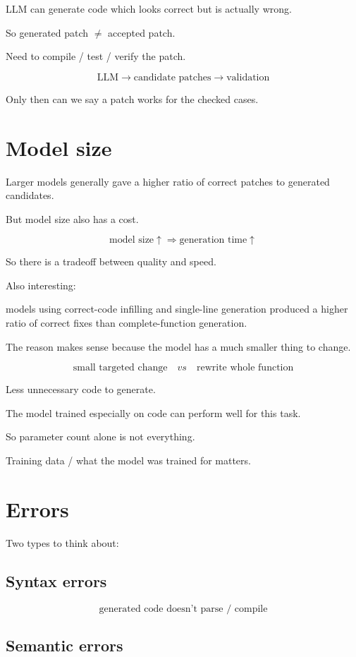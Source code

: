\documentclass[11pt]{book}
\begin{document}
LLM can generate code which looks correct but is
actually wrong.

So generated patch $\neq$ accepted patch.

Need to compile / test / verify the patch.

\[
\text{LLM}
\rightarrow
\text{candidate patches}
\rightarrow
\text{validation}
\]

Only then can we say a patch works for the checked
cases.

\section{Model size}

Larger models generally gave a higher ratio of
correct patches to generated candidates.

But model size also has a cost.

\[
\text{model size}\uparrow
\Rightarrow
\text{generation time}\uparrow
\]

So there is a tradeoff between quality and speed.

Also interesting:

models using correct-code infilling and single-line
generation produced a higher ratio of correct fixes
than complete-function generation.

The reason makes sense because the model has a much
smaller thing to change.

\[
\text{small targeted change}
\quad vs \quad
\text{rewrite whole function}
\]

Less unnecessary code to generate.

The model trained especially on code can perform
well for this task.

So parameter count alone is not everything.

Training data / what the model was trained for matters.

\section{Errors}

Two types to think about:

\subsection{Syntax errors}

\[
\text{generated code doesn't parse / compile}
\]

\subsection{Semantic errors}
\end{document}
